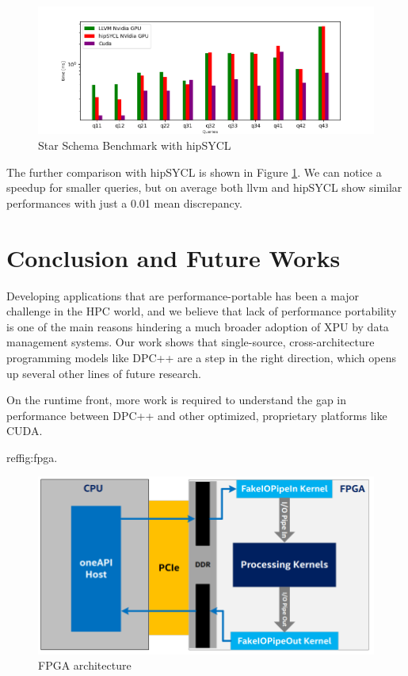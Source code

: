 \documentclass[sigconf, nonacm]{acmart}
\begin{document}
\begin{figure}
    \includegraphics[height=.33\textheight, width=1\linewidth]{figures/queries_hipsycl.png}
    \caption{Star Schema Benchmark with hipSYCL}
    \label{fig:hipsycl}
\end{figure}

The further comparison with hipSYCL is shown in Figure \ref{fig:hipsycl}. We can notice a speedup for smaller queries, but on average both llvm and hipSYCL show similar performances with just a 0.01 mean discrepancy.  

\section{Conclusion and Future Works}
Developing applications that are performance-portable has been a
major challenge in the HPC world, and we believe that lack of performance portability is one of the main reasons hindering a much broader adoption of XPU by data management systems. Our work shows that single-source, cross-architecture programming models like DPC++ are a step in the right direction, which opens up several other lines of future research.

On the runtime front, more work is required to understand the gap in performance between DPC++ and other optimized, proprietary platforms like CUDA.


ref{fig:fpga}.
\begin{figure}[H]
  \centering
  \includegraphics[width=\linewidth]{figures/FPGA.png}
  \caption{FPGA architecture}
  \label{fig:fpga}
\end{figure}
\end{document}
